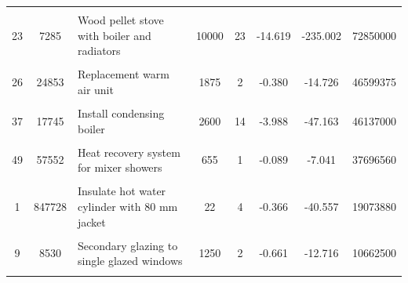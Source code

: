 \begin{table}[!h]
{\begin{tabular}[t]{cc p{6cm} ccccc}
\cellcolor{gray!10}{30} & \cellcolor{gray!10}{73306} & \cellcolor{gray!10}{Fan assisted storage heaters and dual immersion cylinder} & \cellcolor{gray!10}{1124} & \cellcolor{gray!10}{16} & \cellcolor{gray!10}{-0.754} & \cellcolor{gray!10}{-67.301} & \cellcolor{gray!10}{82381283}\\
23 & 7285 & Wood pellet stove with boiler and radiators & 10000 & 23 & -14.619 & -235.002 & 72850000\\
\cellcolor{gray!10}{25} & \cellcolor{gray!10}{60639} & \cellcolor{gray!10}{Fan assisted storage heaters} & \cellcolor{gray!10}{999} & \cellcolor{gray!10}{9} & \cellcolor{gray!10}{-0.751} & \cellcolor{gray!10}{-58.682} & \cellcolor{gray!10}{60563201}\\
26 & 24853 & Replacement warm air unit & 1875 & 2 & -0.380 & -14.726 & 46599375\\
\cellcolor{gray!10}{63} & \cellcolor{gray!10}{103238} & \cellcolor{gray!10}{Party wall insulation} & \cellcolor{gray!10}{450} & \cellcolor{gray!10}{3} & \cellcolor{gray!10}{-0.142} & \cellcolor{gray!10}{-32.712} & \cellcolor{gray!10}{46457100}\\
37 & 17745 & Install condensing boiler & 2600 & 14 & -3.988 & -47.163 & 46137000\\
\cellcolor{gray!10}{10} & \cellcolor{gray!10}{409837} & \cellcolor{gray!10}{Draughtproof single-glazed windows} & \cellcolor{gray!10}{100} & \cellcolor{gray!10}{4} & \cellcolor{gray!10}{-1.012} & \cellcolor{gray!10}{-28.884} & \cellcolor{gray!10}{40983700}\\
49 & 57552 & Heat recovery system for mixer showers & 655 & 1 & -0.089 & -7.041 & 37696560\\
\addlinespace
\cellcolor{gray!10}{22} & \cellcolor{gray!10}{2609} & \cellcolor{gray!10}{Replace boiler with biomass boiler} & \cellcolor{gray!10}{10000} & \cellcolor{gray!10}{15} & \cellcolor{gray!10}{-11.784} & \cellcolor{gray!10}{-106.260} & \cellcolor{gray!10}{26090000}\\
1 & 847728 & Insulate hot water cylinder with 80 mm jacket & 22 & 4 & -0.366 & -40.557 & 19073880\\
\cellcolor{gray!10}{43} & \cellcolor{gray!10}{863} & \cellcolor{gray!10}{Condensing oil boiler with radiators} & \cellcolor{gray!10}{12500} & \cellcolor{gray!10}{10} & \cellcolor{gray!10}{-2.715} & \cellcolor{gray!10}{-18.210} & \cellcolor{gray!10}{10787500}\\
9 & 8530 & Secondary glazing to single glazed windows & 1250 & 2 & -0.661 & -12.716 & 10662500\\
\cellcolor{gray!10}{36} & \cellcolor{gray!10}{1223} & \cellcolor{gray!10}{Replace heating unit with condensing unit} & \cellcolor{gray!10}{2600} & \cellcolor{gray!10}{3} & \cellcolor{gray!10}{-0.396} & \cellcolor{gray!10}{-22.771} & \cellcolor{gray!10}{3179800}\\
\bottomrule
\end{tabular}}
\end{table}